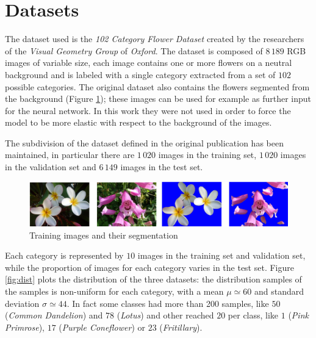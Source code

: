 \section{Datasets}
The dataset used is the \textit{102 Category Flower Dataset} \cite{Nilsback08} created by the researchers of the \textit{Visual Geometry Group} of \textit{Oxford}. The dataset is composed of $8\,189$ RGB images of variable size, each image contains one or more flowers on a neutral background and is labeled with a single category extracted from a set of $102$ possible categories. The original dataset also contains the flowers segmented from the background (Figure \ref{fig_dataset}); these images can be used for example as further input for the neural network. In this work they were not used in order to force the model to be more elastic with respect to the background of the images. \par
The subdivision of the dataset defined in the original publication has been maintained, in particular there are $1\,020$ images in the training set, $1\,020$ images in the validation set and $6\,149$ images in the test set.

\begin{figure}[ht!]
\centering  
\includegraphics[width=1.0\textwidth]{images/dataset.png} 
\caption{Training images and their segmentation}
\label{fig_dataset}
\end{figure}

Each category is represented by $10$ images in the training set and validation set, while the proportion of images for each category varies in the test set. Figure \ref{fig:dist} plots the distribution of the three datasets: the distribution samples of the samples is non-uniform for each category, with a mean $\mu \simeq 60$ and standard deviation $\sigma \simeq 44$. In fact some classes had more than 200 samples, like  $50$ (\textit{Common Dandelion}) and $78$ (\textit{Lotus}) and other reached $20$ per class, like $1$ (\textit{Pink Primrose}), $17$ (\textit{Purple Coneflower}) or $23$ (\textit{Fritillary}).


